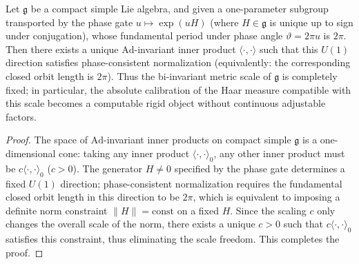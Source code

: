 \begin{proposition}\label{prop:phase-gate-u1-fixes-simple-scale}
Let \(\mathfrak g\) be a compact simple Lie algebra, and given a one-parameter subgroup transported by the phase gate \(u\mapsto \exp(uH)\) (where \(H\in\mathfrak g\) is unique up to sign under conjugation), whose fundamental period under phase angle \(\vartheta=2\pi u\) is \(2\pi\).
Then there exists a unique \(\mathrm{Ad}\)-invariant inner product \(\langle\cdot,\cdot\rangle\) such that this \(U(1)\) direction satisfies phase-consistent normalization (equivalently: the corresponding closed orbit length is \(2\pi\)).
Thus the bi-invariant metric scale of \(\mathfrak g\) is completely fixed; in particular, the absolute calibration of the Haar measure compatible with this scale becomes a computable rigid object without continuous adjustable factors.
\end{proposition}
\begin{proof}
The space of \(\mathrm{Ad}\)-invariant inner products on compact simple \(\mathfrak g\) is a one-dimensional cone: taking any inner product \(\langle\cdot,\cdot\rangle_{0}\), any other inner product must be \(c\langle\cdot,\cdot\rangle_{0}\) (\(c>0\)).
The generator \(H\neq 0\) specified by the phase gate determines a fixed \(U(1)\) direction; phase-consistent normalization requires the fundamental closed orbit length in this direction to be \(2\pi\), which is equivalent to imposing a definite norm constraint \(\|H\|=\mathrm{const}\) on a fixed \(H\).
Since the scaling \(c\) only changes the overall scale of the norm, there exists a unique \(c>0\) such that \(c\langle\cdot,\cdot\rangle_{0}\) satisfies this constraint, thus eliminating the scale freedom. This completes the proof.
\end{proof}

